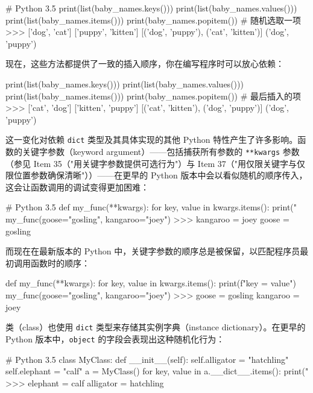 \begin{codebox}[python]
# Python 3.5
print(list(baby_names.keys()))
print(list(baby_names.values()))
print(list(baby_names.items()))
print(baby_names.popitem())  # 随机选取一项
>>>
['dog', 'cat']
['puppy', 'kitten']
[('dog', 'puppy'), ('cat', 'kitten')]
('dog', 'puppy')
\end{codebox}

现在，这些方法都提供了一致的插入顺序，你在编写程序时可以放心依赖：

\begin{codebox}[python]
print(list(baby_names.keys()))
print(list(baby_names.values()))
print(list(baby_names.items()))
print(baby_names.popitem())  # 最后插入的项
>>>
['cat', 'dog']
['kitten', 'puppy']
[('cat', 'kitten'), ('dog', 'puppy')]
('dog', 'puppy')
\end{codebox}

这一变化对依赖 \texttt{dict} 类型及其具体实现的其他 Python 特性产生了许多影响。函数的关键字参数（keyword argument）——包括捕获所有参数的 \texttt{**kwargs} 参数（参见 Item 35（"用关键字参数提供可选行为"）与 Item 37（"用仅限关键字与仅限位置参数确保清晰"））——在更早的 Python 版本中会以看似随机的顺序传入，这会让函数调用的调试变得更加困难：

\begin{codebox}[python]
# Python 3.5
def my_func(**kwargs):
    for key, value in kwargs.items():
        print("%
my_func(goose="gosling", kangaroo="joey")
>>>
kangaroo = joey
goose = gosling
\end{codebox}

而现在在最新版本的 Python 中，关键字参数的顺序总是被保留，以匹配程序员最初调用函数时的顺序：

\begin{codebox}[python]
def my_func(**kwargs):
    for key, value in kwargs.items():
        print(f"{key} = {value}")
my_func(goose="gosling", kangaroo="joey")
>>>
goose = gosling
kangaroo = joey
\end{codebox}

类（class）也使用 \texttt{dict} 类型来存储其实例字典（instance dictionary）。在更早的 Python 版本中，\texttt{object} 的字段会表现出这种随机化行为：

\begin{codebox}[python]
# Python 3.5
class MyClass:
    def __init__(self):
        self.alligator = "hatchling"
        self.elephant = "calf"
a = MyClass()
for key, value in a.__dict__.items():
    print("%
>>>
elephant = calf
alligator = hatchling
\end{codebox}

